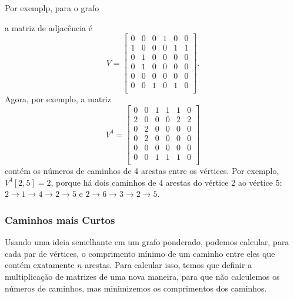 Por exemplp, para o grafo
\begin{center}
\end{center}
a matriz de adjacência é
\[
V= \begin{bmatrix}
  0 & 0 & 0 & 1 & 0 & 0 \\
  1 & 0 & 0 & 0 & 1 & 1 \\
  0 & 1 & 0 & 0 & 0 & 0 \\
  0 & 1 & 0 & 0 & 0 & 0 \\
  0 & 0 & 0 & 0 & 0 & 0 \\
  0 & 0 & 1 & 0 & 1 & 0 \\
 \end{bmatrix}.
\]
Agora, por exemplo, a matriz
\[
V^4= \begin{bmatrix}
  0 & 0 & 1 & 1 & 1 & 0 \\
  2 & 0 & 0 & 0 & 2 & 2 \\
  0 & 2 & 0 & 0 & 0 & 0 \\
  0 & 2 & 0 & 0 & 0 & 0 \\
  0 & 0 & 0 & 0 & 0 & 0 \\
  0 & 0 & 1 & 1 & 1 & 0 \\
 \end{bmatrix}
\]
contém os números de caminhos de 4 arestas
entre os vértices.
Por exemplo, $V^4[2,5]=2$,
porque há dois caminhos de 4 arestas
do vértice 2 ao vértice 5:
$2 \rightarrow 1 \rightarrow 4 \rightarrow 2 \rightarrow 5$
e 
$2 \rightarrow 6 \rightarrow 3 \rightarrow 2 \rightarrow 5$.

\subsubsection{Caminhos mais Curtos}

Usando uma ideia semelhante em um grafo ponderado,
podemos calcular, para cada par de vértices, o comprimento mínimo de um caminho
entre eles que contém exatamente $n$ arestas.
Para calcular isso, temos que definir a multiplicação de matrizes
de uma nova maneira, para que não calculemos os números
de caminhos, mas minimizemos os comprimentos dos caminhos.

